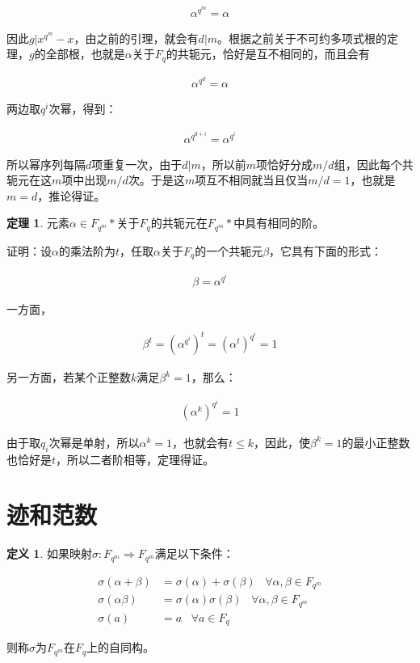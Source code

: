\documentclass[12pt, a4paper, oneside]{ctexart}
\theoremstyle{definition}
\newtheorem*{definition}{定义}
\newtheorem*{theorem}{定理}
\begin{document}
\begin{align*}
\alpha^{q^m}=\alpha
\end{align*}

因此$g|x^{q^m}-x$，由之前的引理，就会有$d|m$。根据之前关于不可约多项式根的定理，$g$的全部根，也就是$\alpha$关于$F_q$的共轭元，恰好是互不相同的，而且会有

\begin{align*}
\alpha^{q^d}=\alpha
\end{align*}

两边取$q^i$次幂，得到：

\begin{align*}
\alpha^{q^{d+i}}=\alpha^{q^i}
\end{align*}

所以幂序列每隔$d$项重复一次，由于$d|m$，所以前$m$项恰好分成$m/d$组，因此每个共轭元在这$m$项中出现$m/d$次。于是这$m$项互不相同就当且仅当$m/d=1$，也就是$m=d$，推论得证。

\begin{theorem}
元素$\alpha\in F_{q^m}*$关于$F_q$的共轭元在$F_{q^m}*$中具有相同的阶。
\end{theorem}

证明：设$\alpha$的乘法阶为$t$，任取$\alpha$关于$F_q$的一个共轭元$\beta$，它具有下面的形式：

\begin{align*}
\beta=\alpha^{q^i}
\end{align*}

一方面，

\begin{align*}
\beta^t=(\alpha^{q^i})^t=(\alpha^t)^{q^i}=1
\end{align*}

另一方面，若某个正整数$k$满足$\beta^k=1$，那么：

\begin{align*}
(\alpha^k)^{q^i}=1
\end{align*}

由于取$q_i$次幂是单射，所以$\alpha^k=1$，也就会有$t\leqslant k$，因此，使$\beta^k=1$的最小正整数也恰好是$t$，所以二者阶相等，定理得证。

\section*{迹和范数}

\begin{definition}
如果映射$\sigma: F_{q^m}\Rightarrow F_{q^m}$满足以下条件：

\begin{align*}
\sigma(\alpha+\beta)&=\sigma(\alpha)+\sigma(\beta)\;\;\; \forall \alpha,\beta\in F_{q^m}\\
\sigma(\alpha\beta)&=\sigma(\alpha)\sigma(\beta)\;\;\; \forall \alpha,\beta\in F_{q^m}\\
\sigma(a)&=a\;\;\; \forall a\in F_q
\end{align*}

则称$\sigma$为$F_{q^m}$在$F_q$上的自同构。
\end{definition}
\end{document}
